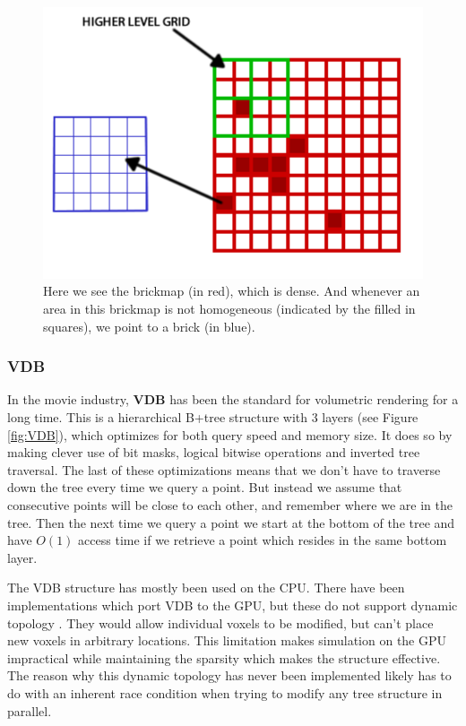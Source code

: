 \begin{figure}
    \centering
    \includegraphics[width=\linewidth]{figures/brickmap.png}
    \caption{Here we see the brickmap (in red), which is dense. And whenever an area in this brickmap is not homogeneous (indicated by the filled in squares), we point to a brick (in blue). \cite{van2015real}}
    \label{fig:brickmap}
\end{figure}
\subsubsection{VDB} \label{related_work:voxel_data_structures:vdb}
In the movie industry, \textbf{VDB} \cite{museth2013vdb} has been the standard for volumetric rendering for a long time. This is a hierarchical B+tree structure with 3 layers (see Figure \ref{fig:VDB}), which optimizes for both query speed and memory size. It does so by making clever use of bit masks, logical bitwise operations and inverted tree traversal. The last of these optimizations means that we don't have to traverse down the tree every time we query a point. But instead we assume that consecutive points will be close to each other, and remember where we are in the tree. Then the next time we query a point we start at the bottom of the tree and have $O(1)$ access time if we retrieve a point which resides in the same bottom layer.

The VDB structure has mostly been used on the CPU. There have been implementations which port VDB to the GPU, but these do not support dynamic topology \cite{hoetzlein2016gvdb} \cite{museth2021nanovdb}. They would allow individual voxels to be modified, but can't place new voxels in arbitrary locations. This limitation makes simulation on the GPU impractical while maintaining the sparsity which makes the structure effective. The reason why this dynamic topology has never been implemented likely has to do with an inherent race condition when trying to modify any tree structure in parallel.

